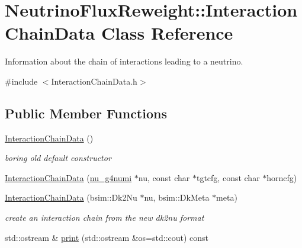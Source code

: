 \hypertarget{class_neutrino_flux_reweight_1_1_interaction_chain_data}{\section{Neutrino\-Flux\-Reweight\-:\-:Interaction\-Chain\-Data Class Reference}
\label{class_neutrino_flux_reweight_1_1_interaction_chain_data}
}


Information about the chain of interactions leading to a neutrino.  




{\ttfamily \#include $<$Interaction\-Chain\-Data.\-h$>$}

\subsection*{Public Member Functions}
\begin{DoxyCompactItemize}
\item 
\hyperlink{class_neutrino_flux_reweight_1_1_interaction_chain_data_aa936bc29461049e00fe62ccf528db2eb}{Interaction\-Chain\-Data} ()
\begin{DoxyCompactList}\small\item\em boring old default constructor \end{DoxyCompactList}\item 
\hyperlink{class_neutrino_flux_reweight_1_1_interaction_chain_data_af2ab1388c8d0c81c53b31f9c3e22fb4e}{Interaction\-Chain\-Data} (\hyperlink{classnu__g4numi}{nu\-\_\-g4numi} $\ast$nu, const char $\ast$tgtcfg, const char $\ast$horncfg)
\item 
\hyperlink{class_neutrino_flux_reweight_1_1_interaction_chain_data_ae8ee384bee786269c30073a2a9600d31}{Interaction\-Chain\-Data} (bsim\-::\-Dk2\-Nu $\ast$nu, bsim\-::\-Dk\-Meta $\ast$meta)
\begin{DoxyCompactList}\small\item\em create an interaction chain from the new dk2nu format \end{DoxyCompactList}\item 
std\-::ostream \& \hyperlink{class_neutrino_flux_reweight_1_1_interaction_chain_data_a27b0c5dc28fcec9536ed6dddf79d0501}{print} (std\-::ostream \&os=std\-::cout) const 
\end{DoxyCompactItemize}
